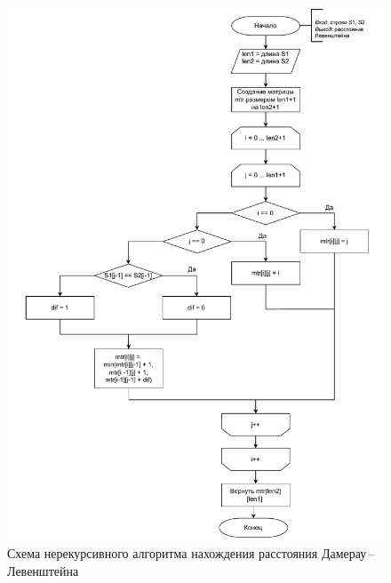\begin{figure}[h]
	\centering
	\includegraphics[height=0.9\textheight, page=2]{img/algoritms.pdf}
	\caption{Схема нерекурсивного алгоритма нахождения расстояния Дамерау\,--\,Левенштейна}
	\label{fig:DLiter}
\end{figure}

\clearpage

